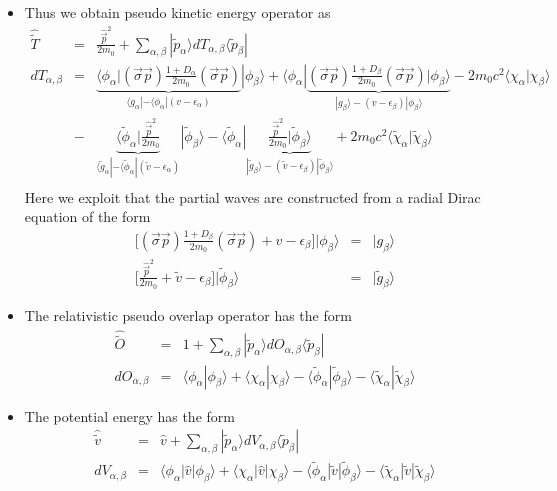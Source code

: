 \documentclass[11pt,a4paper]{report}
\begin{document}
\begin{itemize}
\item Thus we obtain pseudo kinetic energy operator as
\begin{eqnarray}
\hat{\tilde{T}}&=&
\frac{\hat{\vec{p}}^2}{2m_0}
+\sum_{\alpha,\beta}|\tilde{p}_\alpha\rangle 
dT_{\alpha,\beta}\langle\tilde{p}_\beta|
\nonumber\\
dT_{\alpha,\beta}&=&
\underbrace{
\langle\phi_\alpha|
(\vec{\sigma}\vec{p})\frac{1+D_\alpha}{2m_0}(\vec{\sigma}\vec{p})
}_{\langle g_\alpha|-\langle\phi_\alpha|(v-\epsilon_\alpha)}
|\phi_\beta\rangle
+\langle\phi_\alpha|
\underbrace{(\vec{\sigma}\vec{p})\frac{1+D_\beta}{2m_0}(\vec{\sigma}\vec{p})
|\phi_\beta\rangle}_{|g_\beta\rangle-(v-\epsilon_\beta)|\phi_\beta\rangle}
-2m_0c^2\langle\chi_\alpha|\chi_\beta\rangle
\nonumber\\
&-&
\underbrace{
\langle\tilde{\phi}_\alpha|\frac{\hat{\vec{p}}^2}{2m_0}
}_{\langle \tilde{g}_\alpha|-\langle\tilde{\phi}_\alpha|(\tilde{v}-\epsilon_\alpha)}
|\tilde{\phi}_\beta\rangle
-\langle\tilde{\phi}_\alpha|
\underbrace{
\frac{\hat{\vec{p}}^2}{2m_0}|\tilde{\phi}_\beta\rangle
}_{|\tilde{g}_\beta\rangle-(\tilde{v}-\epsilon_\beta)|\tilde{\phi}_\beta\rangle}
+2m_0c^2\langle\tilde{\chi}_\alpha|\tilde{\chi}_\beta\rangle
\nonumber\\
\end{eqnarray}
Here we exploit that the partial waves are constructed from a radial
Dirac equation of the form
\begin{eqnarray}
\biggl[(\vec{\sigma}\vec{p})\frac{1+D_\beta}{2m_0}(\vec{\sigma}\vec{p})
+v-\epsilon_\beta\biggr]|\phi_\beta\rangle&=&|g_\beta\rangle
\nonumber\\
\biggl[
\frac{\hat{\vec{p}}^2}{2m_0}+\tilde{v}-\epsilon_\beta\biggr]
|\tilde{\phi}_\beta\rangle
&=&|\tilde{g}_\beta\rangle
\end{eqnarray}

\item The relativistic pseudo overlap operator has the form
\begin{eqnarray}
\hat{\tilde{O}}&=&1+
\sum_{\alpha,\beta}|\tilde{p}_\alpha\rangle dO_{\alpha,\beta}\langle\tilde{p}_\beta|
\nonumber\\
dO_{\alpha,\beta}&=&
\langle\phi_\alpha|\phi_\beta\rangle+\langle\chi_\alpha|\chi_\beta\rangle
-\langle\tilde{\phi}_\alpha|\tilde{\phi}_\beta\rangle
-\langle\tilde{\chi}_\alpha|\tilde{\chi}_\beta\rangle
\end{eqnarray}

\item The potential energy has the form
\begin{eqnarray}
\hat{\tilde{v}}&=&\hat{v}+
\sum_{\alpha,\beta}|\tilde{p}_\alpha\rangle dV_{\alpha,\beta}\langle\tilde{p}_\beta|
\nonumber\\
dV_{\alpha,\beta}&=&
\langle\phi_\alpha|\hat{v}|\phi_\beta\rangle
+\langle\chi_\alpha|\hat{v}|\chi_\beta\rangle
-\langle\tilde{\phi}_\alpha|\tilde{v}|\tilde{\phi}_\beta\rangle
-\langle\tilde{\chi}_\alpha|\tilde{v}|\tilde{\chi}_\beta\rangle
\end{eqnarray}



\end{itemize}
\end{document}
